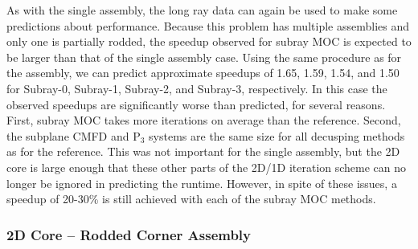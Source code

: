 As with the single assembly, the long ray data can again be used to make some predictions about performance.  Because this problem has multiple assemblies and only one is partially rodded, the speedup observed for subray MOC is expected to be larger than that of the single assembly case.  Using the same procedure as for the assembly, we can predict approximate speedups of 1.65, 1.59, 1.54, and 1.50 for Subray-0, Subray-1, Subray-2, and Subray-3, respectively.  In this case the observed speedups are significantly worse than predicted, for several reasons.  First, subray MOC takes more iterations on average than the reference.  Second, the subplane CMFD and P$_3$ systems are the same size for all decusping methods as for the reference.  This was not important for the single assembly, but the 2D core is large enough that these other parts of the 2D/1D iteration scheme can no longer be ignored in predicting the runtime.  However, in spite of these issues, a speedup of 20-30\% is still achieved with each of the subray MOC methods.

\subsubsection{2D Core -- Rodded Corner Assembly}

